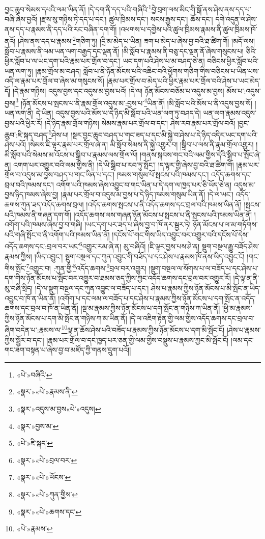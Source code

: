 བྱང་ཆུབ་སེམས་དཔའི་ལམ་ཡིན་ནོ། །དེ་དག་ནི་དད་པའི་གཞིའི་\footnote{«པེ་»བཞིའི་}བྱེ་བྲག་ལས་མིང་གི་སྒོ་ནས་ཤེས་ནས་དད་པ་བཞི་ཞེས་བྱའོ། །རྫས་སུ་གཉིས་ཏེ་དད་པ་དང་། ཚུལ་ཁྲིམས་དང་། སངས་རྒྱས་དང་། ཆོས་དང་། དགེ་འདུན་ལ་ཤེས་ནས་དད་པ་རྣམས་ནི་དད་པའི་རང་བཞིན་དག་གོ། །འཕགས་པ་དགྱེས་པའི་ཚུལ་ཁྲིམས་རྣམས་ནི་ཚུལ་ཁྲིམས་ཁོ་ནའོ། །ཤེས་ནས་དད་པ་རྣམས་\footnote{«སྣར་»«པེ་»རྣམས་ནི་}གཅིག་ཏུ། །དྲི་མ་མེད་པ་ཡིན། ཟག་པ་མེད་པ་ཞེས་བྱ་བའི་ཐ་ཚིག་གོ། །མདོ་ལས། སློབ་པ་རྣམས་ནི་ལམ་ཡན་ལག་བརྒྱད་དང་ལྡན་ནོ། །མི་སློབ་པ་རྣམས་ནི་བཅུ་དང་ལྡན་ནོ་ཞེས་གསུངས་པ། ཅིའི་ཕྱིར་སློབ་པ་ལ་ཡང་དག་པའི་རྣམ་པར་གྲོལ་བ་དང་། ཡང་དག་པའི་ཤེས་པ་མ་བཤད་ཅེ་ན། བཅིངས་ཕྱིར་སློབ་པའི་ཡན་ལག་ཏུ། །རྣམ་གྲོལ་མ་བཤད། སློབ་པ་ནི་ཉོན་མོངས་པའི་འཆིང་བའི་ཕྱོགས་གཅིག་གིས་བཅིངས་པ་ཡིན་པས་འདི་ལ་རྣམ་པར་གྲོལ་བ་ཞེས་མ་གསུངས་སོ། །རྣམ་པར་གྲོལ་བ་མེད་པའི་ཕྱིར་རྣམ་པར་གྲོལ་བའི་ཤེས་པ་ཡང་མེད་དོ། །དེ་རྣམ་གཉིས། འདུས་བྱས་དང་འདུས་མ་བྱས་པའོ། །དེ་ལ། ཉོན་མོངས་བཅོམ་པ་འདུས་མ་བྱས། མོས་པ་:འདུས་བྱས།\footnote{«སྣར་»འདུས་མ་བྱས«པེ་»འདུས།} །ཉོན་མོངས་པ་སྤངས་པ་ནི་རྣམ་གྲོལ་འདུས་མ་:བྱས་པ་\footnote{«སྣར་»བྱས་མ་}ཡིན་ནོ། །མི་སློབ་པའི་མོས་པ་ནི་འདུས་བྱས་སོ། །ཡན་ལག་ནི། དེ་ཡིན། འདུས་བྱས་པའི་མོས་པ་དེ་ཉིད་མི་སློབ་པའི་ཡན་ལག་ཏུ་བཤད་དེ། ཡན་ལག་རྣམས་འདུས་བྱས་པའི་ཕྱིར་རོ། །དེ་ཉིད་རྣམ་གྲོལ་གཉིས། སེམས་རྣམ་པར་གྲོལ་བ་དང་། ཤེས་རབ་རྣམ་པར་གྲོལ་བའོ། །བྱང་ཆུབ་:ཇི་སྐད་བཤད་\footnote{«པེ་»ཇི་སྐད་}ཤེས་པ། །སྔར་བྱང་ཆུབ་བཤད་པ་གང་ཟད་པ་དང་མི་སྐྱེ་བ་ཤེས་པ་དེ་ཉིད་འདིར་ཡང་དག་པའི་ཤེས་པའོ། །སེམས་ཇི་ལྟར་རྣམ་པར་གྲོལ་ཞེ་ན། མི་སློབ་སེམས་ནི་སྐྱེ་འགྱུར་བ། །སྒྲིབ་པ་ལས་ནི་རྣམ་གྲོལ་འགྱུར། །མི་སློབ་པའི་སེམས་མ་འོངས་པ་སྒྲིབ་པ་རྣམས་ལས་གྲོལ་ལོ། །གནས་སྐབས་གང་བའི་ལམ་གྱིས་དེའི་སྒྲིབ་པ་སྤོང་ཞེ་ན། འགག་པར་འགྱུར་བའི་ལམ་གྱིས་ནི། །དེ་ཡི་སྒྲིབ་པ་རབ་ཏུ་སྤོང་། །ད་ལྟར་གྱི་ཞེས་བྱ་བའི་ཐ་ཚིག་གོ། །རྣམ་པར་གྲོལ་བ་འདུས་མ་བྱས་བཤད་པ་གང་ཡིན་པ་དང་། ཁམས་གསུམ་པོ་སྤངས་པའི་ཁམས་དང་། འདོད་ཆགས་དང་བྲལ་བའི་ཁམས་དང་། འགོག་པའི་ཁམས་ཞེས་འབྱུང་བ་གང་ཡིན་པ་དེ་དག་ལ་ཁྱད་པར་ཅི་ཡོད་ཅེ་ན། འདུས་མ་བྱས་ཉིད་ཁམས་ཞེས་བྱ། །རྣམ་པར་གྲོལ་བ་འདུས་མ་བྱས་པ་དེ་ཉིད་ཁམས་གསུམ་ཡིན་ནོ། །དེ་ལ་ཡང་། འདོད་ཆགས་ཀུན་ཟད་འདོད་ཆགས་བྲལ། །འདོད་ཆགས་སྤངས་པ་ནི་འདོད་ཆགས་དང་བྲལ་བའི་ཁམས་ཡིན་ནོ། །སྤངས་པའི་ཁམས་ནི་གཞན་དག་གོ། །འདོད་ཆགས་ལས་གཞན་ཉོན་མོངས་པ་སྤངས་པ་ནི་སྤངས་པའི་ཁམས་ཡིན་ནོ། །འགོག་པའི་ཁམས་ཞེས་བྱ་བ་གཞི། །ཡང་དག་པར་ཟད་པ་ཞེས་བྱ་བ་ཁོ་ནར་སྦྱར་ཏེ། ཉོན་མོངས་པ་ལ་མ་གཏོགས་པའི་གཞི་སྤོང་བ་ནི་འགོག་པའི་ཁམས་ཡིན་ནོ། །དངོས་པོ་གང་གིས་ཡིད་འབྱུང་བར་འགྱུར་བའི་དངོས་པོ་དེས་འདོད་ཆགས་དང་:བྲལ་བར་ཡང་\footnote{«སྣར་»«པེ་»བྲལ་བར་}འགྱུར་རམ་ཞེ་ན། མུ་བཞིའོ། །ཇི་ལྟར་བྱས་པས་ཤེ་ན། སྡུག་བསྔལ་རྒྱུ་བཟོད་ཤེས་རྣམས་ཀྱིས། །ཡིད་འབྱུང་། སྡུག་བསྔལ་དང་ཀུན་འབྱུང་གི་བཟོད་པ་དང་ཤེས་པ་རྣམས་ཁོ་ནས་ཡིད་འབྱུང་ངོ། །གང་གིས་སྤོང་\footnote{«སྣར་»«པེ་»ཡོངས་}འགྱུར་བ། :ཀུན་གྱི་\footnote{«སྣར་»«པེ་»ཀུན་གྱིས་}འདོད་ཆགས་\footnote{«སྣར་»«པེ་»ཆགས་དང་}བྲལ་བར་འགྱུར། །སྡུག་བསྔལ་ལ་སོགས་པ་ལ་བཟོད་པ་དང་ཤེས་པ་དག་གིས་ཉོན་མོངས་པ་སྤོང་བར་འགྱུར་བ་ཐམས་ཅད་ཀྱིས་ཀྱང་འདོད་ཆགས་དང་བྲལ་བར་འགྱུར་རོ། །དེ་ལྟ་ན་ནི་མུ་བཞི་སྲིད། །དེ་ལ་སྡུག་བསྔལ་དང་ཀུན་འབྱུང་ལ་བཟོད་པ་དང་། ཤེས་པ་རྣམས་ཀྱིས་ཉོན་མོངས་པ་མི་སྤོང་ན་ཡིད་འབྱུང་བ་ཁོ་ན་ཡིན་ནོ། །འགོག་པ་དང་ལམ་ལ་བཟོད་པ་དང་ཤེས་པ་རྣམས་ཀྱིས་ཉོན་མོངས་པ་དག་སྤོང་ན་འདོད་ཆགས་དང་བྲལ་བ་ཁོ་ན་ཡིན་ནོ། །སྔ་མ་རྣམས་ཀྱིས་ཉོན་མོངས་པ་དག་སྤོང་ན་གཉིས་ཀ་ཡིན་ནོ། །ཕྱི་མ་རྣམས་ཀྱིས་ཉོན་མོངས་པ་དག་མི་སྤོང་ན་གཉིས་ཀ་མ་ཡིན་ནོ། །དེ་ལ་འཇིག་རྟེན་གྱི་ལམ་གྱིས་འདོད་ཆགས་དང་བྲལ་བ་ཞིག་བདེན་པ་:རྣམས་ལ་\footnote{«པེ་»རྣམས་}ལྟ་ན་ཆོས་ཤེས་པའི་བཟོད་པ་རྣམས་ཀྱིས་ཉོན་མོངས་པ་དག་མི་སྤོང་ངོ། །ཤེས་པ་རྣམས་ཀྱིས་སྦྱོར་བ་དང་། །རྣམ་པར་གྲོལ་བ་དང་ཁྱད་པར་ཅན་གྱི་ལམ་གྱིས་བསྡུས་པ་རྣམས་ཀྱང་མི་སྤོང་ངོ། །ལམ་དང་གང་ཟག་བསྟན་པ་ཞེས་བྱ་བ་མཛོད་ཀྱི་གནས་དྲུག་པའོ།། 
